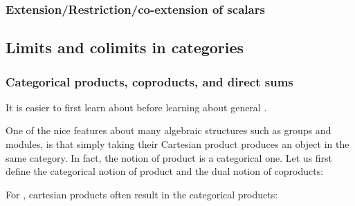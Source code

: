 

\subsubsection{Extension/Restriction/co-extension of scalars}









\subsection{Limits and colimits in categories}

\subsubsection{Categorical products, coproducts, and direct sums}

It is easier to first learn about  before learning about general .

One of the nice features about many algebraic structures such as groups and modules, is that simply taking their Cartesian product produces an object in the same category. In fact, the notion of product is a categorical one. Let us first define the categorical notion of product and the dual notion of coproducts:



For , cartesian products often result in the categorical products:







